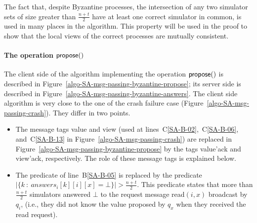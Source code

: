 \documentclass[11pt,letterpaper]{article}
\begin{document}
The fact that, despite Byzantine processes,  the intersection of any two
simulator  sets of  size greater than $\frac{n+t}{2}$ have at least one
correct simulator in common, is used in many places in the algorithm.
This property will be used in the proof to show that the local views
of the correct processes are mutually consistent.


\paragraph{The operation ${\sf propose}()$}
The client side of the algorithm implementing the operation ${\sf propose}()$
is described in Figure~\ref{algo-SA-msg-passing-byzantine-propose}; its server
side is described in Figure~\ref{algo-SA-msg-passing-byzantine-answers}.
The client side  algorithm is very close to the one of the crash failure case
(Figure~\ref{algo-SA-msg-passing-crash}).  They differ in two points.
\begin{itemize}
\vspace{-0.2cm}
\item
The  message tags {\sc value} and {\sc view} (used at
lines~C\ref{SA-B-02},~C\ref{SA-B-06},  and~C\ref{SA-B-13}
in Figure~\ref{algo-SA-msg-passing-crash}) are replaced
in Figure~\ref{algo-SA-msg-passing-byzantine-propose}
by the  tags  {\sc value'ack} and {\sc view'ack}, respectively. 
The role of these message tags is explained below.
\vspace{-0.2cm}
\item
The predicate of line~B\ref{SA-B-05}  is replaced by the predicate
$|\{k~:~answers_i[k][i][x]=\bot\}|>\frac{n+t}{2}$.
This predicate states that more than $\frac{n+t}{2}$ simulators
answered $\bot$  to the request message {\sc  read}$(i,x)$ broadcast by $q_i$,
(i.e.,  they  did   not know the  value   proposed   by $q_x$   when  they
received the  read request).
\end{itemize}
\end{document}
